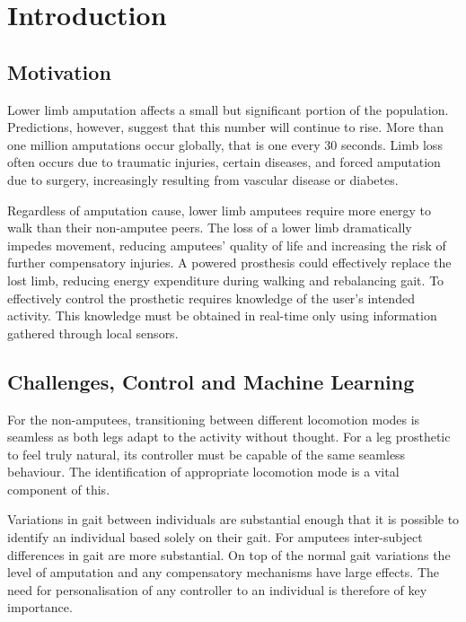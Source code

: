 \chapter{Introduction}
\label{chp:intro}

\section{Motivation}
Lower limb amputation affects a small but significant portion of the population. Predictions, however, suggest that this number will continue to rise. More than one million amputations occur globally, that is one every 30 seconds.\cite{Asif2021} Limb loss often occurs due to traumatic injuries, certain diseases, and forced amputation due to surgery, increasingly resulting from vascular disease or diabetes\cite{Griffin2012, Walter2022}. 

Regardless of amputation cause, lower limb amputees require more energy to walk than their non-amputee peers\cite{Vllasolli2014}. The loss of a lower limb dramatically impedes movement\cite{Gregg2014, Wong2021, Srisuwan2021}, reducing amputees' quality of life and increasing the risk of further compensatory injuries. A powered prosthesis could effectively replace the lost limb, reducing energy expenditure during walking and rebalancing gait\cite{Lin2014}. To effectively control the prosthetic requires knowledge of the user's intended activity. This knowledge must be obtained in real-time only using information gathered through local sensors.\cite{Tucker2015}

\section{Challenges, Control and Machine Learning}
For the non-amputees, transitioning between different locomotion modes is seamless as both legs adapt to the activity without thought. For a leg prosthetic to feel truly natural, its controller must be capable of the same seamless behaviour. The identification of appropriate locomotion mode is a vital component of this. 

Variations in gait between individuals are substantial enough that it is possible to identify an individual based solely on their gait\cite{Zeng2021, Kwon2021}. For amputees inter-subject differences in gait are more substantial. On top of the normal gait variations the level of amputation and any compensatory mechanisms have large effects. The need for personalisation of any controller to an individual is therefore of key importance.

